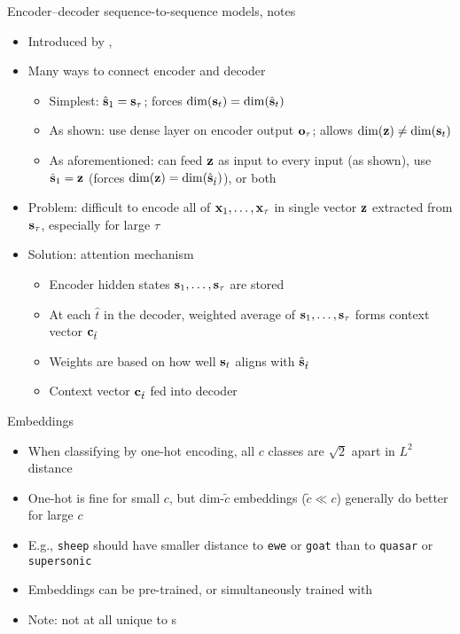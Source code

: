 \begin{frame}{Encoder--decoder sequence-to-sequence models, notes}
    \begin{itemize}
        \item Introduced by \citet{ChoEMNLP14}, \citet{Sutskever14}
        \item Many ways to connect encoder and decoder
        \begin{itemize}
            \item Simplest: $\hat{\mathbf{s}}_1 = \mathbf{s}_\tau$; forces $\dim(\mathbf{s}_t) = \dim(\hat{\mathbf{s}}_t)$
            \item As shown: use dense layer on encoder output $\mathbf{o}_\tau$; allows $\dim(\mathbf{z}) \ne \dim(\mathbf{s}_t)$
            \item As aforementioned: can feed $\mathbf{z}$ as input to every input (as shown), use $\hat{\mathbf{s}}_1 = \mathbf{z}$ (forces $\dim(\mathbf{z}) = \dim(\hat{\mathbf{s}}_{\hat{t}})$), or both
        \end{itemize}
        \pause
        \item Problem: difficult to encode all of $\mathbf{x}_1, \dots, \mathbf{x}_\tau$ in single vector $\mathbf{z}$ extracted from $\mathbf{s}_\tau$, especially for large $\tau$
        \item Solution: attention mechanism \citep{BahdanauICLR15}
        \begin{itemize}
            \item Encoder hidden states $\mathbf{s}_1, \dots, \mathbf{s}_\tau$ are stored
            \item At each $\hat{t}$ in the decoder, weighted average of $\mathbf{s}_1, \dots, \mathbf{s}_\tau$ forms context vector $\mathbf{c}_{\hat{t}}$
            \item Weights are based on how well $\mathbf{s}_t$ aligns with $\hat{\mathbf{s}}_{\hat{t}}$
            \item Context vector $\mathbf{c}_{\hat{t}}$ fed into decoder
        \end{itemize}
    \end{itemize}
\end{frame}

\begin{frame}{Embeddings}
    \begin{itemize}
        \item When classifying by one-hot encoding, all $c$ classes are $\sqrt{2}$ apart in $L^2$ distance
        \item One-hot is fine for small $c$, but dim-$\tilde{c}$ embeddings ($\tilde{c} \ll c$) generally do better for large $c$
        \item E.g., \texttt{sheep} should have smaller distance to \texttt{ewe} or \texttt{goat} than to \texttt{quasar} or \texttt{supersonic}
        \item Embeddings can be pre-trained, or simultaneously trained with \rnn
        \item Note: not at all unique to \rnn{}s
    \end{itemize}

    
\end{frame}

